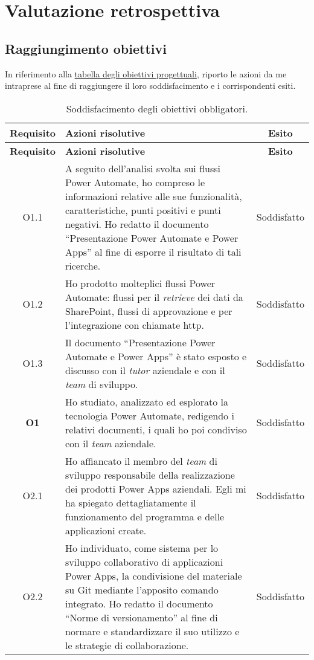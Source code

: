 \chapter{Valutazione retrospettiva}
\label{cap:valutazioneRetrospettiva}
\section{Raggiungimento obiettivi}
In riferimento alla \hyperref[tab:obiettiviProgettuali]{tabella degli obiettivi progettuali}, riporto le azioni da me intraprese al fine di raggiungere il loro soddisfacimento e i corrispondenti esiti.

\begingroup
\renewcommand\arraystretch{1.3}
\begin{longtable}{|c|p{8cm}|c|}
    \caption{Soddisfacimento degli obiettivi obbligatori.}
    \label{tab:soddObbObbligatori}\\
    \hline \textbf{Requisito} & \textbf{Azioni risolutive} & \textbf{Esito}\\ \endfirsthead
    \hline \textbf{Requisito} & \textbf{Azioni risolutive} & \textbf{Esito}\\ \endhead
    \endfoot
    \hline \endlastfoot
    \hline O1.1  & A seguito dell'analisi svolta sui flussi Power Automate, ho compreso le informazioni relative alle sue funzionalità, caratteristiche, punti positivi e punti negativi. Ho redatto il documento “Presentazione Power Automate e Power Apps” al fine di esporre il risultato di tali ricerche. & Soddisfatto\\
    \hline O1.2  & Ho prodotto molteplici flussi Power Automate: flussi per il \emph{retrieve} dei dati da SharePoint, flussi di approvazione e per l'integrazione con chiamate \gls{http}. & Soddisfatto\\
    \hline O1.3  & Il documento “Presentazione Power Automate e Power Apps” è stato esposto e discusso con il \emph{tutor} aziendale e con il \emph{team} di sviluppo. & Soddisfatto\\
    \hline \textbf{O1}    & Ho studiato, analizzato ed esplorato la tecnologia Power Automate, redigendo i relativi documenti, i quali ho poi condiviso con il \emph{team} aziendale. & Soddisfatto\\
    \hline O2.1  & Ho affiancato il membro del \emph{team} di sviluppo responsabile della realizzazione dei prodotti Power Apps aziendali. Egli mi ha spiegato dettagliatamente il funzionamento del programma e delle applicazioni create. & Soddisfatto\\
    \hline O2.2  & Ho individuato, come sistema per lo sviluppo collaborativo di applicazioni Power Apps, la condivisione del materiale su Git mediante l'apposito comando integrato. Ho redatto il documento “Norme di versionamento” al fine di normare e standardizzare il suo utilizzo e le strategie di collaborazione. & Soddisfatto\\

\end{longtable}
